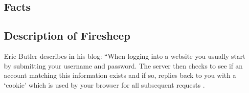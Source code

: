 \documentclass[11pt]{article}
\begin{document}
\thispagestyle{empty} %
\newpage


\thispagestyle{empty}  %
\tableofcontents

\newpage



\begin{multicols}{2}
\setcounter{page}{1}
\section{Facts}



\subsection{Description of Firesheep}
Eric Butler describes in his blog: ``When logging into a website you usually start by submitting your username and password. The server then checks to see if an account matching this information exists and if so, replies back to you with a `cookie' which is used by your browser for all subsequent requests \cite{eric-butler}.


\end{multicols}
\end{document}
